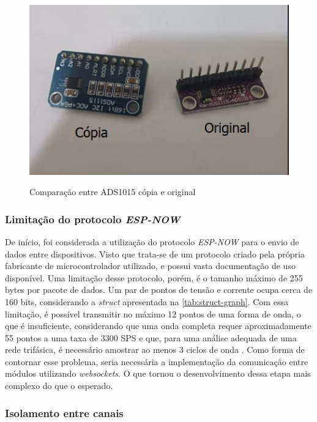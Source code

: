 \begin{figure}[h!]
    \centering
    \caption{Comparação entre ADS1015 cópia e original}
    \vspace*{5mm}
    \includegraphics[width=\textwidth, height=\textheight, keepaspectratio]{figuras/adc-fake-comparison.jpeg}
    \label{fig:adc-falsificado}
    \fonte{}
\end{figure}

\subsubsection{Limitação do protocolo \textit{ESP-NOW}}\label{limit-espnow}

De início, foi considerada a utilização do protocolo \textit{ESP-NOW} para o envio de dados entre dispositivos. Visto que trata-se de um protocolo criado pela própria fabricante de microcontrolador utilizado, e possui vasta documentação de uso disponível.
Uma limitação desse protocolo, porém, é o tamanho máximo de 255 bytes por pacote de dados. Um par de pontos de tensão e corrente ocupa cerca de 160 bits, considerando a \textit{struct} apresentada na \autoref{tab:struct-graph}. Com essa limitação, é possível transmitir no máximo 12 pontos de uma forma de onda, o que é insuficiente, considerando que uma onda completa requer aproximadamente 55 pontos a uma taxa de 3300 \gls{SPS} e que, para uma análise adequada de uma rede trifásica, é necessário amostrar ao menos 3 ciclos de onda \cite{3ph-ozm}.
Como forma de contornar esse problema, seria necessária a implementação da comunicação entre módulos utilizando \textit{websockets}. O que tornou o desenvolvimento dessa etapa mais complexo do que o esperado.

\subsubsection{Isolamento entre canais}\label{isola-canais-dific}

